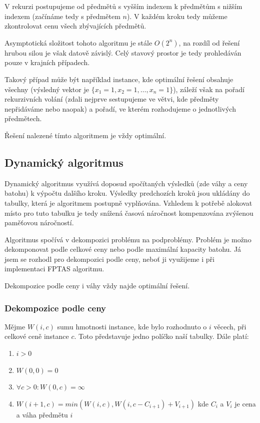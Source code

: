 \documentclass[11pt]{article}
\begin{document}
V rekurzi postupujeme od předmětů s vyšším indexem k předmětům s nižším indexem (začínáme tedy s předmětem $n$). V každém kroku tedy můžeme zkontrolovat cenu všech zbývajících předmětů.

Asymptotická složitost tohoto algoritmu je stále $O(2^n)$, na rozdíl od řešení hrubou silou je však datově závislý. Celý stavový prostor je tedy prohledáván pouze v krajních případech.

Takový případ může být například instance, kde optimální řešení obsahuje všechny (výsledný vektor je $\{x_1 = 1, x_2 = 1, \ldots, x_n = 1\}$), záleží však na pořadí rekurzivních volání (zdali nejprve sestupujeme ve větvi, kde předměty nepřidáváme nebo naopak) a pořadí, ve kterém rozhodujeme o jednotlivých předmětech.

Řešení nalezené tímto algoritmem je vždy optimální.

\subsection{Dynamický algoritmus}

Dynamický algoritmus využívá doposud spočítaných výsledků (zde váhy a ceny batohu) k výpočtu dalšího kroku. Výsledky predchozích kroků jsou ukládány do tabulky, která je algoritmem postupně vyplňována. Vzhledem k potřebě alokovat místo pro tuto tabulku je tedy snížená časová náročnost kompenzována zvýšenou paměťovou náročností.

Algoritmus spočívá v dekompozici problému na podproblémy. Problém je možno dekomponovat podle celkové ceny nebo podle maximální kapacity batohu. Já jsem se rozhodl pro dekompozici podle ceny, neboť ji využijeme i při implementaci FPTAS algoritmu.

Dekompozice podle ceny i váhy vždy najde optimální řešení.

\subsubsection{Dekompozice podle ceny}

Mějme $W(i, c)$ sumu hmotnosti instance, kde bylo rozhodnuto o $i$ věcech, při celkové ceně instance $c$. Toto představuje jedno políčko naší tabulky. Dále platí:

\begin{enumerate}
	\item $i > 0$ 
	\item $W(0,0) = 0$
	\item $\forall c > 0: W(0,c) = \infty$
	\item $W(i+1, c) = min(W(i,c), W(i, c - C_{i+1}) + V_{i+1})$ kde $C_i$ a $V_i$ je cena a váha předmětu $i$
\end{enumerate}
\end{document}
